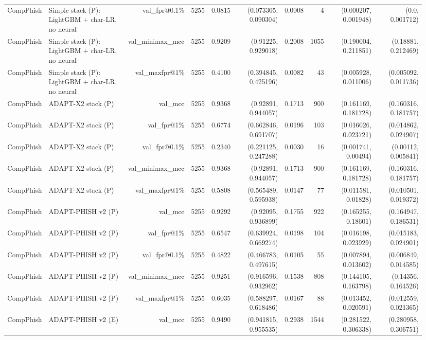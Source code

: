 \begin{table}[t]
\begin{tabular}{llrrrrrrrr}
CompPhish & Simple stack (P): LightGBM + char-LR, no neural & val\_fpr@0.1\% & 5255 & 0.0815 & (0.073305, 0.090304) & 0.0008 & 4 & (0.000207, 0.001948) & (0.0, 0.001712) \\
CompPhish & Simple stack (P): LightGBM + char-LR, no neural & val\_minimax\_mcc & 5255 & 0.9209 & (0.91225, 0.929018) & 0.2008 & 1055 & (0.190004, 0.211851) & (0.18881, 0.212469) \\
CompPhish & Simple stack (P): LightGBM + char-LR, no neural & val\_maxfpr@1\% & 5255 & 0.4100 & (0.394845, 0.425196) & 0.0082 & 43 & (0.005928, 0.011006) & (0.005092, 0.011736) \\
CompPhish & ADAPT-X2 stack (P) & val\_mcc & 5255 & 0.9368 & (0.92891, 0.944057) & 0.1713 & 900 & (0.161169, 0.181728) & (0.160316, 0.181757) \\
CompPhish & ADAPT-X2 stack (P) & val\_fpr@1\% & 5255 & 0.6774 & (0.662846, 0.691707) & 0.0196 & 103 & (0.016026, 0.023721) & (0.014862, 0.024907) \\
CompPhish & ADAPT-X2 stack (P) & val\_fpr@0.1\% & 5255 & 0.2340 & (0.221125, 0.247288) & 0.0030 & 16 & (0.001741, 0.00494) & (0.00112, 0.005841) \\
CompPhish & ADAPT-X2 stack (P) & val\_minimax\_mcc & 5255 & 0.9368 & (0.92891, 0.944057) & 0.1713 & 900 & (0.161169, 0.181728) & (0.160316, 0.181757) \\
CompPhish & ADAPT-X2 stack (P) & val\_maxfpr@1\% & 5255 & 0.5808 & (0.565489, 0.595938) & 0.0147 & 77 & (0.011581, 0.01828) & (0.010501, 0.019372) \\
CompPhish & ADAPT-PHISH v2 (P) & val\_mcc & 5255 & 0.9292 & (0.92095, 0.936899) & 0.1755 & 922 & (0.165255, 0.18601) & (0.164947, 0.186531) \\
CompPhish & ADAPT-PHISH v2 (P) & val\_fpr@1\% & 5255 & 0.6547 & (0.639924, 0.669274) & 0.0198 & 104 & (0.016198, 0.023929) & (0.015183, 0.024901) \\
CompPhish & ADAPT-PHISH v2 (P) & val\_fpr@0.1\% & 5255 & 0.4822 & (0.466783, 0.497615) & 0.0105 & 55 & (0.007894, 0.013602) & (0.006849, 0.014585) \\
CompPhish & ADAPT-PHISH v2 (P) & val\_minimax\_mcc & 5255 & 0.9251 & (0.916596, 0.932962) & 0.1538 & 808 & (0.144105, 0.163798) & (0.14356, 0.164526) \\
CompPhish & ADAPT-PHISH v2 (P) & val\_maxfpr@1\% & 5255 & 0.6035 & (0.588297, 0.618486) & 0.0167 & 88 & (0.013452, 0.020591) & (0.012559, 0.021365) \\
CompPhish & ADAPT-PHISH v2 (E) & val\_mcc & 5255 & 0.9490 & (0.941815, 0.955535) & 0.2938 & 1544 & (0.281522, 0.306338) & (0.280958, 0.306751) \\

\end{tabular}
\end{table}
